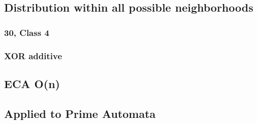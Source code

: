 \documentclass[11pt]{article}
\begin{document}
    \subsection{Distribution within all possible neighborhoods}
    \subsubsection{30, Class 4}
    \subsubsection{XOR additive}
        \subsection{ECA O(n)}
    \subsection{Applied to Prime Automata}
    \cite{Wolfram}

    
    
\end{document}
